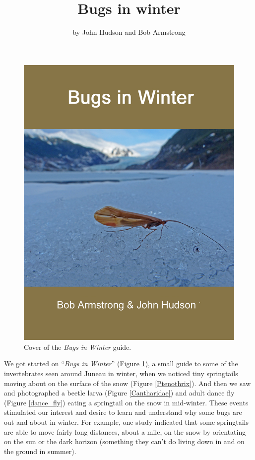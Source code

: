 \title{Bugs in winter}

\author{by John Hudson and Bob Armstrong}

\maketitle

\begin{figure}[H]
\begin{center}
\includegraphics[width=\textwidth]{img/bugs_in_winter.jpg}
\caption{Cover of the \textit{Bugs in Winter} guide.}
\label{bugs_in_winter}
\end{center}
\end{figure}

We got started on ``\textit{Bugs in Winter}'' (Figure \ref{bugs_in_winter}), a small guide to some of the invertebrates seen around Juneau in winter, when we noticed tiny springtails moving about on the surface of the snow (Figure \ref{Ptenothrix}). And then we saw and photographed a beetle larva (Figure \ref{Cantharidae}) and adult dance fly (Figure \ref{dance_fly}) eating a springtail on the snow in mid-winter. These events stimulated our interest and desire to learn and understand why some bugs are out and about in winter. For example, one study indicated that some springtails are able to move fairly long distances, about a mile, on the snow by orientating on the sun or the dark horizon (something they can't do living down in and on the ground in summer).

